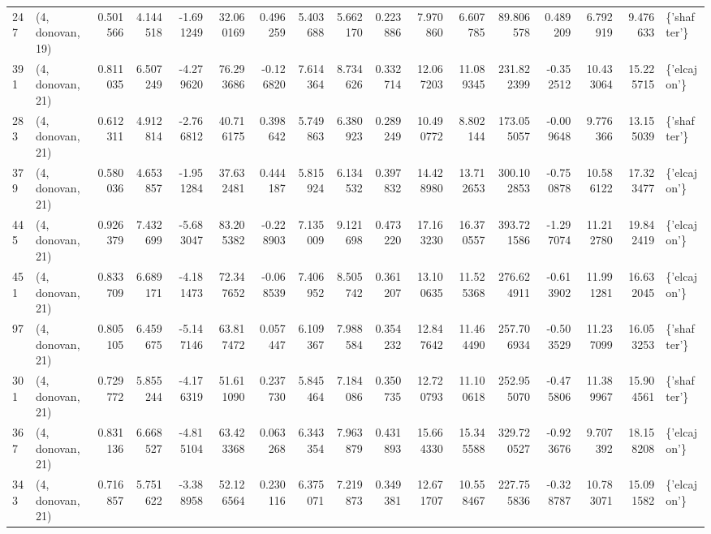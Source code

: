 \begin{tabular}{llrrrrrrrrrrrrrrl}
247 &  (4, donovan, 19) &   0.501566 &   4.144518 &  -1.691249 &    32.060169 &   0.496259 &   5.403688 &   5.662170 &  0.223886 &   7.970860 &   6.607785 &    89.806578 &   0.489209 &   6.792919 &   9.476633 &  \{'shafter'\} \\
391 &  (4, donovan, 21) &   0.811035 &   6.507249 &  -4.279620 &    76.293686 &  -0.126820 &   7.614364 &   8.734626 &  0.332714 &  12.067203 &  11.089345 &   231.822399 &  -0.352512 &  10.433064 &  15.225715 &  \{'elcajon'\} \\
283 &  (4, donovan, 21) &   0.612311 &   4.912814 &  -2.766812 &    40.716175 &   0.398642 &   5.749863 &   6.380923 &  0.289249 &  10.490772 &   8.802144 &   173.055057 &  -0.009648 &   9.776366 &  13.155039 &  \{'shafter'\} \\
379 &  (4, donovan, 21) &   0.580036 &   4.653857 &  -1.951284 &    37.632481 &   0.444187 &   5.815924 &   6.134532 &  0.397832 &  14.428980 &  13.712653 &   300.102853 &  -0.750878 &  10.586122 &  17.323477 &  \{'elcajon'\} \\
445 &  (4, donovan, 21) &   0.926379 &   7.432699 &  -5.683047 &    83.205382 &  -0.228903 &   7.135009 &   9.121698 &  0.473220 &  17.163230 &  16.370557 &   393.721586 &  -1.297074 &  11.212780 &  19.842419 &  \{'elcajon'\} \\
451 &  (4, donovan, 21) &   0.833709 &   6.689171 &  -4.181473 &    72.347652 &  -0.068539 &   7.406952 &   8.505742 &  0.361207 &  13.100635 &  11.525368 &   276.624911 &  -0.613902 &  11.991281 &  16.632045 &  \{'elcajon'\} \\
97  &  (4, donovan, 21) &   0.805105 &   6.459675 &  -5.147146 &    63.817472 &   0.057447 &   6.109367 &   7.988584 &  0.354232 &  12.847642 &  11.464490 &   257.706934 &  -0.503529 &  11.237099 &  16.053253 &  \{'shafter'\} \\
301 &  (4, donovan, 21) &   0.729772 &   5.855244 &  -4.176319 &    51.611090 &   0.237730 &   5.845464 &   7.184086 &  0.350735 &  12.720793 &  11.100618 &   252.955070 &  -0.475806 &  11.389967 &  15.904561 &  \{'shafter'\} \\
367 &  (4, donovan, 21) &   0.831136 &   6.668527 &  -4.815104 &    63.423368 &   0.063268 &   6.343354 &   7.963879 &  0.431893 &  15.664330 &  15.345588 &   329.720527 &  -0.923676 &   9.707392 &  18.158208 &  \{'elcajon'\} \\
343 &  (4, donovan, 21) &   0.716857 &   5.751622 &  -3.388958 &    52.126564 &   0.230116 &   6.375071 &   7.219873 &  0.349381 &  12.671707 &  10.558467 &   227.755836 &  -0.328787 &  10.783071 &  15.091582 &  \{'elcajon'\} \\

\end{tabular}
